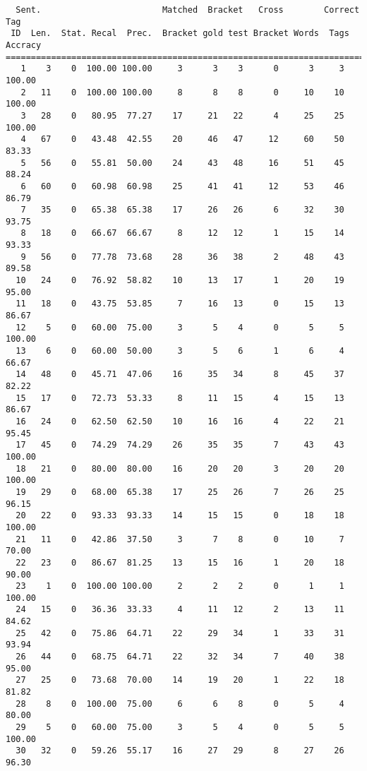 \scriptsize
\begin{verbatim}
  Sent.                        Matched  Bracket   Cross        Correct Tag
 ID  Len.  Stat. Recal  Prec.  Bracket gold test Bracket Words  Tags Accracy
============================================================================
   1    3    0  100.00 100.00     3      3    3      0      3     3   100.00
   2   11    0  100.00 100.00     8      8    8      0     10    10   100.00
   3   28    0   80.95  77.27    17     21   22      4     25    25   100.00
   4   67    0   43.48  42.55    20     46   47     12     60    50    83.33
   5   56    0   55.81  50.00    24     43   48     16     51    45    88.24
   6   60    0   60.98  60.98    25     41   41     12     53    46    86.79
   7   35    0   65.38  65.38    17     26   26      6     32    30    93.75
   8   18    0   66.67  66.67     8     12   12      1     15    14    93.33
   9   56    0   77.78  73.68    28     36   38      2     48    43    89.58
  10   24    0   76.92  58.82    10     13   17      1     20    19    95.00
  11   18    0   43.75  53.85     7     16   13      0     15    13    86.67
  12    5    0   60.00  75.00     3      5    4      0      5     5   100.00
  13    6    0   60.00  50.00     3      5    6      1      6     4    66.67
  14   48    0   45.71  47.06    16     35   34      8     45    37    82.22
  15   17    0   72.73  53.33     8     11   15      4     15    13    86.67
  16   24    0   62.50  62.50    10     16   16      4     22    21    95.45
  17   45    0   74.29  74.29    26     35   35      7     43    43   100.00
  18   21    0   80.00  80.00    16     20   20      3     20    20   100.00
  19   29    0   68.00  65.38    17     25   26      7     26    25    96.15
  20   22    0   93.33  93.33    14     15   15      0     18    18   100.00
  21   11    0   42.86  37.50     3      7    8      0     10     7    70.00
  22   23    0   86.67  81.25    13     15   16      1     20    18    90.00
  23    1    0  100.00 100.00     2      2    2      0      1     1   100.00
  24   15    0   36.36  33.33     4     11   12      2     13    11    84.62
  25   42    0   75.86  64.71    22     29   34      1     33    31    93.94
  26   44    0   68.75  64.71    22     32   34      7     40    38    95.00
  27   25    0   73.68  70.00    14     19   20      1     22    18    81.82
  28    8    0  100.00  75.00     6      6    8      0      5     4    80.00
  29    5    0   60.00  75.00     3      5    4      0      5     5   100.00
  30   32    0   59.26  55.17    16     27   29      8     27    26    96.30

\end{verbatim}
